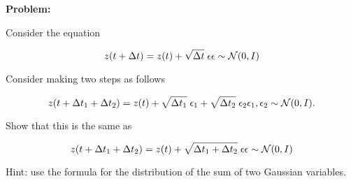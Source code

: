 \documentclass{article}
\begin{document}
\medskip

{\bf Problem:}
    
Consider the equation

$$z(t + \Delta t) = z(t) + \sqrt{\Delta t}\;\epsilon      \epsilon \sim {\cal N}(0,I)$$

Consider making two steps as follows


$$z(t + \Delta t_1 + \Delta t_2) = z(t) + \sqrt{\Delta t_1}\;\epsilon_1 + \sqrt{\Delta t_2}\;\epsilon_2      \epsilon_1,\epsilon_2 \sim {\cal N}(0,I).$$

Show that this is the same as 

$$z(t + \Delta t_1 + \Delta t _2) = z(t) + \sqrt{\Delta t_1 + \Delta t_2}\;\epsilon      \epsilon \sim {\cal N}(0,I)$$

Hint: use the formula for the distribution of the sum of two Gaussian variables.
\end{document}
